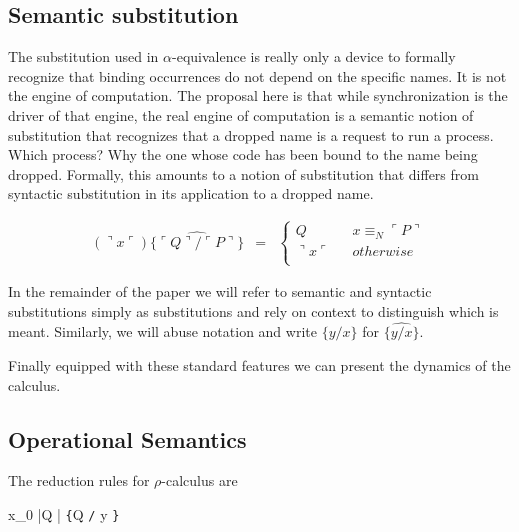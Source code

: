 \documentclass[]{entcs}
\newcommand{\lliftb}{\langle\!|}
\newcommand{\rliftb}{|\!\rangle}
\newcommand{\lpquote}{\ulcorner}
\newcommand{\rpquote}{\urcorner}
\newcommand{\id}[1]{\texttt{#1}}
\newcommand{\juxtap}{\mathbin{\id{|}}}
\newcommand{\concat}{\mathbin{.}}
\newcommand{\nameeq}{\mathbin{\equiv_N}}
\newcommand{\lift}[2]{#1 \lliftb #2 \rliftb}
\newcommand{\quotep}[1]{\lpquote #1 \rpquote}
\newcommand{\dropn}[1]{\rpquote #1 \lpquote}
\newcommand{\substp}[2]{\id{\{} \quotep{#1} / \quotep{#2} \id{\}}}
\newcommand{\substn}[2]{\id{\{} #1 / #2 \id{\}}}
\newcommand{\psubstp}[2]{\widehat{\substp{#1}{#2}}}
\newcommand{\psubstn}[2]{\widehat{\substn{#1}{#2}}}
\newcommand{\red}{\rightarrow}
\newcommand{\rhoc}{$\rho$-calculus}
\begin{document}
\subsection{Semantic substitution}

The substitution used in $\alpha$-equivalence is really only a device
to formally recognize that binding occurrences do not depend on the
specific names. It is not the engine of computation. The proposal here
is that while synchronization is the driver of that engine, the real
engine of computation is a semantic notion of substitution that
recognizes that a dropped name is a request to run a process. Which
process? Why the one whose code has been bound to the name being
dropped. Formally, this amounts to a notion of substitution that
differs from syntactic substitution in its application to a dropped
name.

\begin{eqnarray}
(\dropn{x})  \psubstp{Q}{P}       
		& = & 
		\left\{ 
			\begin{array}{ccc} 
				Q & & x \nameeq \quotep{P} \\
                              	\dropn{x} & & otherwise \\
			\end{array}
		\right. \nonumber
\end{eqnarray}

In the remainder of the paper we will refer to semantic and syntactic
substitutions simply as substitutions and rely on context to
distinguish which is meant. Similarly, we will abuse notation and
write $\substn{y}{x}$ for $\psubstn{y}{x}$.

Finally equipped with these standard features we can present the
dynamics of the calculus.

\subsection{Operational Semantics}
The reduction rules for {\rhoc}  are


\infrule[Comm]
{ {x}_{0} \nameeq {x}_{1} }
{{\lift{x_{0}}{Q} \juxtap { x_{1} \id{(}{y} \id{)} \concat {P}}}
\red {P}\id{\{}\quotep{Q} \id{/} {y} \id{\}}}
\end{document}
